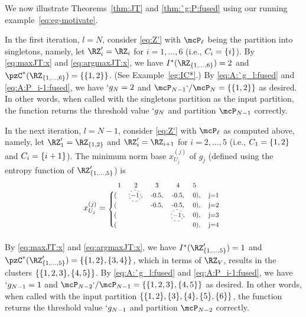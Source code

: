 \begin{example}
	We now illustrate Theorems~\ref{thm:JT} and \ref{thm:`g:P:fused} using our running
	example~\eqref{eq:eg-motivate}.

	In the first iteration, $l=N$, consider \eqref{eq:Z'} with $\mcP_{\ell}$ being the partition into
	singletons, namely, let $\RZ'_i=\RZ_i$ for $i=1, \dots, 6$ (i.e., $C_i=\{i\}$).
	By \eqref{eq:maxJT:x} and \eqref{eq:argmaxJT:x},
	we have $I^{*}(\RZ_{\Set{1,\ldots,6}}) = 2$ and $\pzC^*(\RZ_{\Set{1,\dots,6}})=\Set {\Set {1,2}}$. (See Example~\ref{eg:IC*}.)
	By \eqref{eq:A:`g_l:fused} and \eqref{eq:A:P_i-1:fused},
	we have $`g_{N}=2$ and $\mcP_{N-1}`/\mcP_{N}=\Set{\Set{1,2}}$ as desired. 
	In other words, when called with the
	singletons partition
	as the input partition, the function \Agglomerate returns the threshold value $`g_{N}$ and partition
	$\mcP_{N-1}$ correctly.
	
	In the next iteration, $l=N-1$, consider \eqref{eq:Z'} with $\mcP_{\ell}$ as computed above,
	namely, let $\RZ'_1 = \RZ_{\Set{1,2}}$ and $\RZ'_{i} = \RZ_{i+1}$ for
	$i=2,\ldots,5$ (i.e., $C_1=\{1,2\}$ and $C_i=\{i+1\}$).
	The minimum norm base $x_{U_{j}}^{(j)}$ of $g_{j}$ (defined using the entropy function of $\RZ'_{\Set{1,\dots,5}}$) is
	\begin{align*}
	x_{U_j}^{(j)} =\scalebox{0.8}{
	\begin{blockarray}{lcc cl c}
		\phantom{n}1 & 2 & 3 & 4 & 5 \\
					\begin{block}{\{lcc cc c}
							 (& \circled{-1}, & -0.5, & -0.5, & 0),   & j=1 \\
							 (&     & -0.5, & -0.5, & 0),   & j=2 \\
							 (&     &       & \circled{-1},   & 0),   & j=3 \\
							 (&     &       &       & 0),   & j=4 \\
					\end{block}
	\end{blockarray}}
	\end{align*}
	By \eqref{eq:maxJT:x} and \eqref{eq:argmaxJT:x},
	we have $I^{*}(\RZ'_{\Set{1,\ldots,5}}) = 1$ and 
	$\pzC^{*}(\RZ'_{\Set{1,\ldots,5}}) = \Set{\Set{1,2},\Set{3,4}}$, which in terms of
	$\RZ_{V}$, results in the clusters $\{\{1,2,3\},\{4,5\}\}$.
	By \eqref{eq:A:`g_l:fused} and \eqref{eq:A:P_i-1:fused},
	we have $`g_{N-1}=1$ and $\mcP_{N-2}`/\mcP_{N-1}=\Set{\Set{1,2,3},\Set{4,5}}$ as desired. 
	In other words, when called with the input partition $\{\{1,2\},\{3\},\{4\},\{5\},
	\{6\}\}$, the function \Agglomerate returns the threshold value $`g_{N-1}$ and partition
	$\mcP_{N-2}$ correctly.


\end{example}

